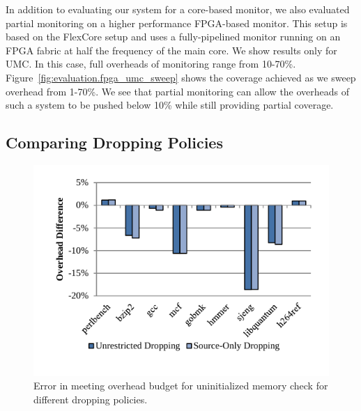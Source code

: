 In addition to evaluating our system for a core-based monitor, we also
evaluated partial monitoring on a higher performance FPGA-based monitor. This
setup is based on the FlexCore \cite{flexcore-micro10} setup and uses a
fully-pipelined monitor running on an FPGA fabric at half the frequency of the
main core. We show results only for UMC. In this case, full overheads of
monitoring range from 10-70\%. Figure~\ref{fig:evaluation.fpga_umc_sweep} shows
the coverage achieved as we sweep overhead from 1-70\%. We see that partial
monitoring can allow the overheads of such a system to be pushed below 10\%
while still providing partial coverage.

\subsection{Comparing Dropping Policies}

\begin{figure}
  \begin{center}
    \includegraphics[width=\columnwidth]{figs/data_umc_exec_time.pdf}
    \vspace{-0.2in}
    \caption{Error in meeting overhead budget for uninitialized memory check for different dropping policies.}
    \label{fig:evaluation.umc_exec_time}
    \vspace{-0.2in}
  \end{center}
\end{figure}

